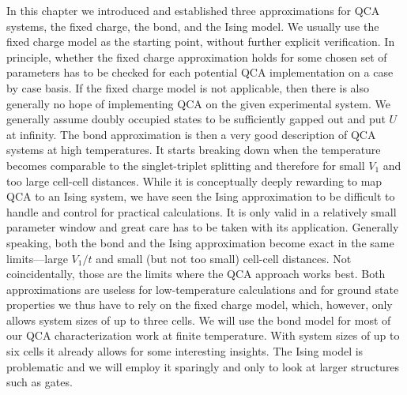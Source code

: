 %

In this chapter we introduced and established three approximations for QCA
systems, the fixed charge, the bond, and the Ising model. We usually use the
fixed charge model as the starting point, without further explicit verification.
In principle, whether the fixed charge approximation holds for some chosen set
of parameters has to be checked for each potential QCA implementation on a case
by case basis. If the fixed charge model is not applicable, then there is also
generally no hope of implementing QCA on the given experimental system. We
generally assume doubly occupied states to be sufficiently gapped out and put
$U$ at infinity. The bond approximation is then a very good description of QCA
systems at high temperatures. It starts breaking down when the temperature
becomes comparable to the singlet-triplet splitting and therefore for small
$V_1$ and too large cell-cell distances. While it is conceptually deeply
rewarding to map QCA to an Ising system, we have seen the Ising approximation to
be difficult to handle and control for practical calculations. It is only valid
in a relatively small parameter window and great care has to be taken with its
application. Generally speaking, both the bond and the Ising approximation
become exact in the same limits---large $V_1/t$ and small (but not too small)
cell-cell distances. Not coincidentally, those are the limits where the QCA
approach works best. Both approximations are useless for low-temperature
calculations and for ground state properties we thus have to rely on the fixed
charge model, which, however, only allows system sizes of up to three cells. We
will use the bond model for most of our QCA characterization work at finite
temperature. With system sizes of up to six cells it already allows for some
interesting insights. The Ising model is problematic and we will employ it
sparingly and only to look at larger structures such as gates.

